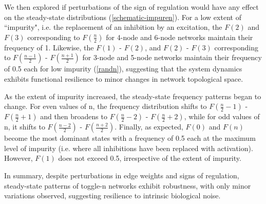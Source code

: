 \documentclass[11pt,a4paper]{article}
\theoremstyle{definition}
\theoremstyle{remark}
\begin{document}
We then explored if perturbations of the sign of regulation would have any effect on the steady-state distributions (\cref{schematic-impuren}). For a low extent of ``impurity", i.e. the replacement of an inhibition by an excitation, the $F(2)$ and $F(3)$ corresponding to $F(\frac{n}{2})$ for 4-node and 6-node networks maintain their frequency of 1. Likewise, the $F(1)$ - $F(2)$, and $F(2)$ - $F(3)$ corresponding to $F(\frac{n-1}{2})$ - $F(\frac{n+1}{2})$ for 3-node and 5-node networks maintain their frequency of 0.5 each for low impurity (\cref{randn}), suggesting that the system dynamics exhibits functional resilience to minor changes in network topological space. 

As the extent of impurity increased, the steady-state frequency patterns began to change. For even values of n, the frequency distribution shifts to $F(\frac{n}{2}-1)$ - $F(\frac{n}{2}+1)$ and then broadens to $F(\frac{n}{2}-2)$ - $F(\frac{n}{2}+2)$, while for odd values of n, it shifts to $F(\frac{n-2}{2})$ - $F(\frac{n+2}{2})$. Finally, as expected, $F(0)$ and $F(n)$ become the most dominant states with a frequency of 0.5 each at the maximum level of impurity (i.e. where all inhibitions have been replaced with activation). However, $F(1)$ does not exceed 0.5, irrespective of the extent of impurity. 

In summary, despite perturbations in edge weights and signs of regulation, steady-state patterns of toggle-n networks exhibit robustness, with only minor variations observed, suggesting resilience to intrinsic biological noise.
\end{document}
